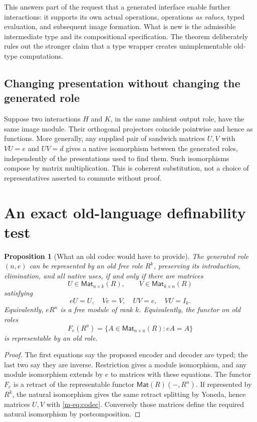 \documentclass[11pt]{article}
\newtheorem{proposition}[theorem]{Proposition}
\theoremstyle{definition}
\theoremstyle{remark}
\newcommand{\Mat}{\mathsf{Mat}}
\begin{document}
This answers part of the request that a generated interface enable further interactions: it supports its own actual operations, operations \emph{as values}, typed evaluation, and subsequent image formation. What is new is the admissible intermediate type and its compositional specification. The theorem deliberately rules out the stronger claim that a type wrapper creates unimplementable old-type computations.

\subsection{Changing presentation without changing the generated role}
Suppose two interactions $H$ and $K$, in the same ambient output role, have the same image module. Their orthogonal projectors coincide pointwise and hence as functions. More generally, any supplied pair of sandwich matrices $U,V$ with $VU=e$ and $UV=d$ gives a native isomorphism between the generated roles, independently of the presentations used to find them. Such isomorphisms compose by matrix multiplication. This is coherent substitution, not a choice of representatives asserted to commute without proof.

\section{An exact old-language definability test}
\begin{proposition}[What an old codec would have to provide]\label{m-prop:codec}
The generated role $(n,e)$ can be represented by an old free role $R^k$, preserving its introduction, elimination, and all native uses, if and only if there are matrices
\[
 U\in\Mat_{n\times k}(R),\qquad V\in\Mat_{k\times n}(R)
\]
satisfying
\begin{equation}\label{m-eq:codec}
 eU=U,\quad Ve=V,\quad UV=e,\quad VU=I_k.
\end{equation}
Equivalently, $eR^n$ is a free module of rank $k$. Equivalently, the functor on old roles
\[
 F_e(R^a)=\{A\in\Mat_{n\times a}(R):eA=A\}
\]
is representable by an old role.
\end{proposition}
\begin{proof}
The first equations say the proposed encoder and decoder are typed; the last two say they are inverse. Restriction gives a module isomorphism, and any module isomorphism extends by $e$ to matrices with these equations. The functor $F_e$ is a retract of the representable functor $\Mat(R)(-,R^n)$. If represented by $R^k$, the natural isomorphism gives the same retract splitting by Yoneda, hence matrices $U,V$ with \eqref{m-eq:codec}. Conversely those matrices define the required natural isomorphism by postcomposition.
\end{proof}
\end{document}
